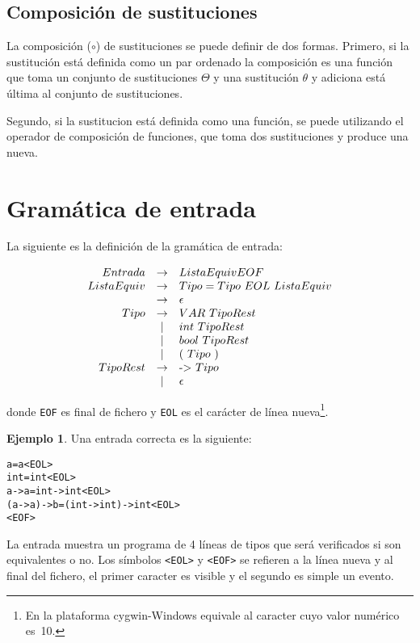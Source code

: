 \documentclass{article}
\theoremstyle{definition}
\newtheorem{example}{Ejemplo}[section]
\begin{document}
\subsection{Composición de sustituciones}
\label{sec:compsus}

La composición ($\circ$) de sustituciones se puede definir de dos
formas. Primero, si la sustitución está definida como un par ordenado
la composición es una función que toma un conjunto de sustituciones
$\Theta$ y una sustitución $\theta$ y adiciona está última al conjunto
de sustituciones.

Segundo, si la sustitucion está definida como una
función, se puede utilizando el operador de composición de funciones,
que toma dos sustituciones y produce una nueva.

\section{Gramática de entrada}
\label{sec:gramatica-de-entrada}

La siguiente es la definición de la gramática de entrada:

\[
  \begin{array}[h]{rcl}
    Entrada & \to  & ListaEquiv EOF \\
    ListaEquiv & \to & Tipo = Tipo\ EOL\ ListaEquiv\\
            & \to & \epsilon \\
    Tipo    & \to & VAR\  TipoRest\\
            & \mid & int\ TipoRest\\
            & \mid & bool\ TipoRest \\
            & \mid & (\ Tipo\ ) \\
    TipoRest & \to & \text{-$>$}\ Tipo \\
             & \mid & \epsilon \\
  \end{array}
\]

donde \texttt{EOF} es final de fichero y \texttt{EOL} es el carácter
de línea nueva\footnote{En la plataforma cygwin-Windows equivale al
  caracter cuyo valor numérico es~10.}.

\begin{example}
Una entrada correcta es la siguiente:

\begin{alltt}
a = a <EOL>
int = int <EOL>
a -> a = int -> int <EOL>
(a -> a) -> b = (int -> int) -> int <EOL>
<EOF>
\end{alltt}

La entrada muestra un programa de 4 líneas de tipos que será
verificados si son equivalentes o no. Los símbolos \verb!<EOL>! y
\verb!<EOF>! se refieren a la línea nueva y al final del fichero, el
primer caracter es visible y el segundo es simple un evento.
\end{example}
\end{document}
